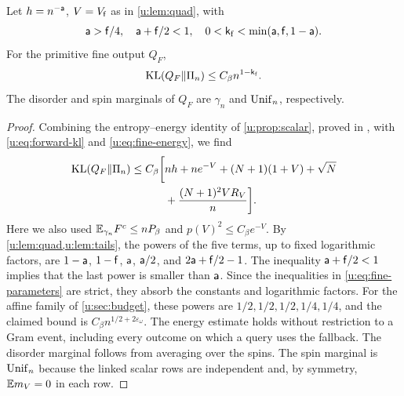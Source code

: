 \begin{proposition}\label{u:prop:fine-kl}
Let $h=n^{-\mathsf{a}}$, $V=V_{\mathsf{f}}$ as in \cref{u:lem:quad}, with
\begin{equation}\label{u:eq:fine-parameters}
 \mathsf{a}>\mathsf{f}/4,\quad \mathsf{a}+\mathsf{f}/2<1,\quad0<\mathsf{k}_{\rm f}<\min(\mathsf{a},\mathsf{f},1-\mathsf{a}).
\end{equation}
For the primitive fine output $Q_F$,
\begin{equation}\label{u:eq:fine-kl}
 \operatorname{KL}(Q_F\Vert \Pi_n)\le C_\beta n^{1-\mathsf{k}_{\rm f}}.
\end{equation}
The disorder and spin marginals of $Q_F$ are $\gamma_n$ and
$\operatorname{Unif}_n$, respectively.
\end{proposition}
\begin{proof}
Combining the entropy--energy identity of \cref{u:prop:scalar}, proved in
\cite[Lemma~4]{oai-typical-upper}, with
\eqref{u:eq:forward-kl} and \eqref{u:eq:fine-energy}, we find
\begin{equation}\label{u:eq:fine-kl-budget}
 \begin{aligned}
 \operatorname{KL}(Q_F\Vert\Pi_n)\le C_\beta\biggl[
 &nh+ne^{-V}+(N+1)(1+V)+\sqrt N\\
 &+\frac{(N+1)^2VR_V}{n}\biggr].
 \end{aligned}
\end{equation}
Here we also used $\mathbb E_{\gamma_n}F^c\le nP_\beta$ and
$p(V)^2\le C_\beta e^{-V}$. By \cref{u:lem:quad,u:lem:tails},
the powers of the five terms, up to fixed logarithmic factors, are
$1-\mathsf{a}$, $1-\mathsf{f}$, $\mathsf{a}$, $\mathsf{a}/2$, and $2\mathsf{a}+\mathsf{f}/2-1$.
The inequality $\mathsf{a}+\mathsf{f}/2<1$ implies that the last power is
smaller than $\mathsf{a}$.
Since the inequalities in \eqref{u:eq:fine-parameters} are strict, they absorb the constants and logarithmic factors.
For the affine family of \cref{u:sec:budget}, these powers are $1/2,1/2,1/2,1/4,1/4$, and the claimed
bound is $C_\beta n^{1/2+2\varepsilon_\omega}$. The energy estimate holds without restriction to a Gram event,
including every outcome on which a query uses the fallback. The disorder
marginal follows from averaging over the spins. The spin
marginal is $\operatorname{Unif}_n$ because the linked scalar rows are independent
and, by symmetry, $\mathbb E m_V=0$ in each row.
\end{proof}

